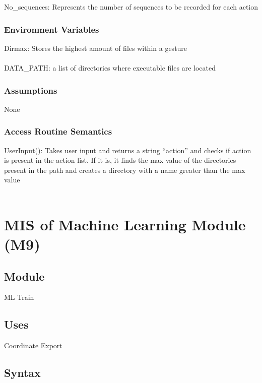 \documentclass[12pt, titlepage]{article}
\begin{document}
No\_sequences: Represents the number of sequences to be recorded for each action

\subsubsection{Environment Variables}

Dirmax: Stores the highest amount of files within a gesture\\
\\
DATA\_PATH:  a list of directories where executable files are located\\

\subsubsection{Assumptions}

None\\

\subsubsection{Access Routine Semantics}

UserInput(): Takes user input and returns a string “action” and checks if action is present in the action list. If it is, it finds the max value of the directories present in the path and creates a directory with a name greater than the max value\\

~\newpage

\section{MIS of Machine Learning Module (M9)} \label{M9}

\subsection{Module}

ML Train\\

\subsection{Uses}

Coordinate Export\\

\subsection{Syntax}
\end{document}
